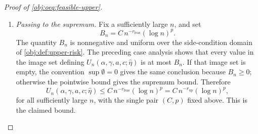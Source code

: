 \documentclass[11pt]{article}
\begin{document}
\begin{proof}[Proof of \cref{obj:oeq:feasible-upper}]
\begin{enumerate}
\item \emph{Passing to the supremum.}  Fix a sufficiently large \(n\), and set
\[
B_n=C\,n^{-r_{\mathrm{feas}}}(\log n)^p .
\]
The quantity \(B_n\) is nonnegative and uniform over the side-condition domain of \cref{obj:def:upper-risk}.  The preceding case analysis shows that every value in the image set defining \(U_n(\alpha,\gamma,a,c;\widehat\eta)\) is at most \(B_n\).  If that image set is empty, the convention \(\sup\emptyset=0\) gives the same conclusion because \(B_n\ge0\); otherwise the pointwise bound gives the supremum bound.  Therefore
\[
U_n(\alpha,\gamma,a,c;\widehat\eta)
\le
C\,n^{-r_{\mathrm{feas}}}(\log n)^{p}
=
C\,n^{-r_{\mathrm{up}}}(\log n)^{p},
\]
for all sufficiently large \(n\), with the single pair \((C,p)\) fixed above.  This is the claimed bound. %
\end{enumerate}
\end{proof}
\end{document}
